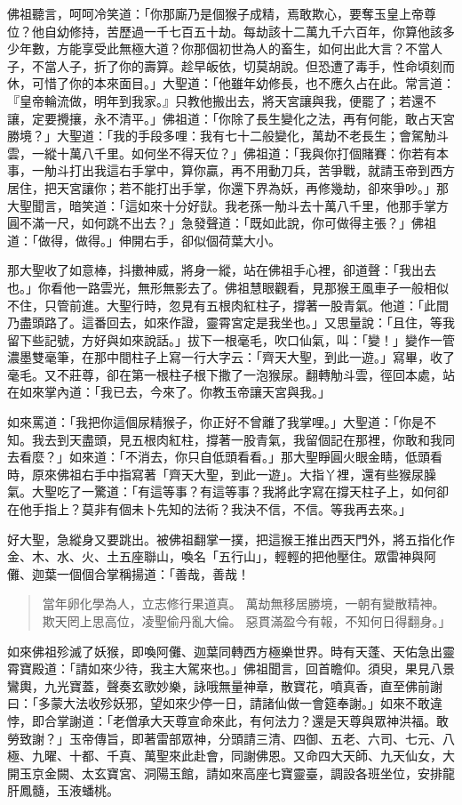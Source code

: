 佛祖聽言，呵呵冷笑道：「你那廝乃是個猴子成精，焉敢欺心，要奪玉皇上帝尊位？他自幼修持，苦歷過一千七百五十劫。每劫該十二萬九千六百年，你算他該多少年數，方能享受此無極大道？你那個初世為人的畜生，如何出此大言？不當人子，不當人子，折了你的壽算。趁早皈依，切莫胡說。但恐遭了毒手，性命頃刻而休，可惜了你的本來面目。」大聖道：「他雖年幼修長，也不應久占在此。常言道：『皇帝輪流做，明年到我家。』只教他搬出去，將天宮讓與我，便罷了；若還不讓，定要攪攘，永不清平。」佛祖道：「你除了長生變化之法，再有何能，敢占天宮勝境？」大聖道：「我的手段多哩：我有七十二般變化，萬劫不老長生；會駕觔斗雲，一縱十萬八千里。如何坐不得天位？」佛祖道：「我與你打個賭賽：你若有本事，一觔斗打出我這右手掌中，算你贏，再不用動刀兵，苦爭戰，就請玉帝到西方居住，把天宮讓你；若不能打出手掌，你還下界為妖，再修幾劫，卻來爭吵。」那大聖聞言，暗笑道：「這如來十分好獃。我老孫一觔斗去十萬八千里，他那手掌方圓不滿一尺，如何跳不出去？」急發聲道：「既如此說，你可做得主張？」佛祖道：「做得，做得。」伸開右手，卻似個荷葉大小。

那大聖收了如意棒，抖擻神威，將身一縱，站在佛祖手心裡，卻道聲：「我出去也。」你看他一路雲光，無形無影去了。佛祖慧眼觀看，見那猴王風車子一般相似不住，只管前進。大聖行時，忽見有五根肉紅柱子，撐著一股青氣。他道：「此間乃盡頭路了。這番回去，如來作證，靈霄宮定是我坐也。」又思量說：「且住，等我留下些記號，方好與如來說話。」拔下一根毫毛，吹口仙氣，叫：「變！」變作一管濃墨雙毫筆，在那中間柱子上寫一行大字云：「齊天大聖，到此一遊。」寫畢，收了毫毛。又不莊尊，卻在第一根柱子根下撒了一泡猴尿。翻轉觔斗雲，徑回本處，站在如來掌內道：「我已去，今來了。你教玉帝讓天宮與我。」

如來罵道：「我把你這個尿精猴子，你正好不曾離了我掌哩。」大聖道：「你是不知。我去到天盡頭，見五根肉紅柱，撐著一股青氣，我留個記在那裡，你敢和我同去看麼？」如來道：「不消去，你只自低頭看看。」那大聖睜圓火眼金睛，低頭看時，原來佛祖右手中指寫著「齊天大聖，到此一遊」。大指丫裡，還有些猴尿臊氣。大聖吃了一驚道：「有這等事？有這等事？我將此字寫在撐天柱子上，如何卻在他手指上？莫非有個未卜先知的法術？我決不信，不信。等我再去來。」

好大聖，急縱身又要跳出。被佛祖翻掌一撲，把這猴王推出西天門外，將五指化作金、木、水、火、土五座聯山，喚名「五行山」，輕輕的把他壓住。眾雷神與阿儺、迦葉一個個合掌稱揚道：「善哉，善哉！
\begin{quote}
當年卵化學為人，立志修行果道真。
萬劫無移居勝境，一朝有變散精神。
欺天罔上思高位，凌聖偷丹亂大倫。
惡貫滿盈今有報，不知何日得翻身。」
\end{quote}

如來佛祖殄滅了妖猴，即喚阿儺、迦葉同轉西方極樂世界。時有天蓬、天佑急出靈霄寶殿道：「請如來少待，我主大駕來也。」佛祖聞言，回首瞻仰。須臾，果見八景鸞輿，九光寶蓋，聲奏玄歌妙樂，詠哦無量神章，散寶花，噴真香，直至佛前謝曰：「多蒙大法收殄妖邪，望如來少停一日，請諸仙做一會筵奉謝。」如來不敢違悖，即合掌謝道：「老僧承大天尊宣命來此，有何法力？還是天尊與眾神洪福。敢勞致謝？」玉帝傳旨，即著雷部眾神，分頭請三清、四御、五老、六司、七元、八極、九曜、十都、千真、萬聖來此赴會，同謝佛恩。又命四大天師、九天仙女，大開玉京金闕、太玄寶宮、洞陽玉館，請如來高座七寶靈臺，調設各班坐位，安排龍肝鳳髓，玉液蟠桃。

